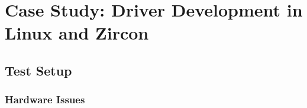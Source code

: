 
\chapter{Case Study: Driver Development in Linux and Zircon} \label{ch:case-study}

\section{Test Setup}

\subsection{Hardware Issues}
%
%
%
%
%
%
%
%
%
%

